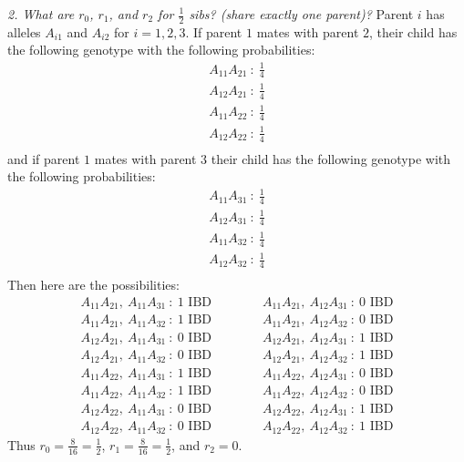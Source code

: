 \documentclass{article}
\begin{document}
        \emph{2. What are $r_0$, $r_1$, and $r_2$ for $\frac{1}{2}$ sibs? (share exactly one parent)?}  {\color{magenta}Parent $i$ has alleles $A_{i1}$ and $A_{i2}$ for $i = 1, 2, 3$.  If parent $1$ mates with parent $2$, their child has the following genotype with the following probabilities:
                \begin{align*}
                    A_{11}A_{21}\ :\ \frac{1}{4} \\
                    A_{12}A_{21}\ :\ \frac{1}{4} \\
                    A_{11}A_{22}\ :\ \frac{1}{4} \\
                    A_{12}A_{22}\ :\ \frac{1}{4} \\
                \end{align*}
                and if parent $1$ mates with parent $3$ their child has the following genotype with the following probabilities:
                \begin{align*}
                    A_{11}A_{31}\ :\ \frac{1}{4} \\
                    A_{12}A_{31}\ :\ \frac{1}{4} \\
                    A_{11}A_{32}\ :\ \frac{1}{4} \\
                    A_{12}A_{32}\ :\ \frac{1}{4} \\
                \end{align*}
                Then here are the possibilities:
                \begin{align*}
                    A_{11}A_{21},\ A_{11}A_{31}\ :\ 1\text{ IBD} \qquad\qquad A_{11}A_{21},\ A_{12}A_{31}\ :\ 0\text{ IBD} \\
                    A_{11}A_{21},\ A_{11}A_{32}\ :\ 1\text{ IBD} \qquad\qquad A_{11}A_{21},\ A_{12}A_{32}\ :\ 0\text{ IBD} \\
                    A_{12}A_{21},\ A_{11}A_{31}\ :\ 0\text{ IBD} \qquad\qquad A_{12}A_{21},\ A_{12}A_{31}\ :\ 1\text{ IBD} \\
                    A_{12}A_{21},\ A_{11}A_{32}\ :\ 0\text{ IBD} \qquad\qquad A_{12}A_{21},\ A_{12}A_{32}\ :\ 1\text{ IBD} \\
                    A_{11}A_{22},\ A_{11}A_{31}\ :\ 1\text{ IBD} \qquad\qquad A_{11}A_{22},\ A_{12}A_{31}\ :\ 0\text{ IBD} \\
                    A_{11}A_{22},\ A_{11}A_{32}\ :\ 1\text{ IBD} \qquad\qquad A_{11}A_{22},\ A_{12}A_{32}\ :\ 0\text{ IBD} \\
                    A_{12}A_{22},\ A_{11}A_{31}\ :\ 0\text{ IBD} \qquad\qquad A_{12}A_{22},\ A_{12}A_{31}\ :\ 1\text{ IBD} \\
                    A_{12}A_{22},\ A_{11}A_{32}\ :\ 0\text{ IBD} \qquad\qquad A_{12}A_{22},\ A_{12}A_{32}\ :\ 1\text{ IBD}
                \end{align*}
                Thus $r_0 = \frac{8}{16} = \frac{1}{2}$, $r_1 = \frac{8}{16} = \frac{1}{2}$, and $r_2 = 0$.} \\
        
\end{document}
